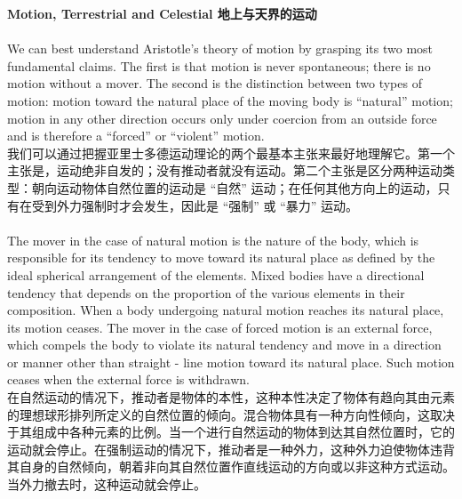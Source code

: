 \documentclass{article}
\begin{document}
\noindent\textbf{Motion, Terrestrial and Celestial 地上与天界的运动}\\
\\
We can best understand Aristotle’s theory of motion by grasping its two most fundamental claims. The first is that motion is never spontaneous; there is no motion without a mover. The second is the distinction between two types of motion: motion toward the natural place of the moving body is “natural” motion; motion in any other direction occurs only under coercion from an outside force and is therefore a “forced” or “violent” motion.\\
我们可以通过把握亚里士多德运动理论的两个最基本主张来最好地理解它。第一个主张是，运动绝非自发的；没有推动者就没有运动。第二个主张是区分两种运动类型：朝向运动物体自然位置的运动是 “自然” 运动；在任何其他方向上的运动，只有在受到外力强制时才会发生，因此是 “强制” 或 “暴力” 运动。\\

\\
The mover in the case of natural motion is the nature of the body, which is responsible for its tendency to move toward its natural place as defined by the ideal spherical arrangement of the elements. Mixed bodies have a directional tendency that depends on the proportion of the various elements in their composition. When a body undergoing natural motion reaches its natural place, its motion ceases. The mover in the case of forced motion is an external force, which compels the body to violate its natural tendency and move in a direction or manner other than straight - line motion toward its natural place. Such motion ceases when the external force is withdrawn.\\
在自然运动的情况下，推动者是物体的本性，这种本性决定了物体有趋向其由元素的理想球形排列所定义的自然位置的倾向。混合物体具有一种方向性倾向，这取决于其组成中各种元素的比例。当一个进行自然运动的物体到达其自然位置时，它的运动就会停止。在强制运动的情况下，推动者是一种外力，这种外力迫使物体违背其自身的自然倾向，朝着非向其自然位置作直线运动的方向或以非这种方式运动。当外力撤去时，这种运动就会停止。\\
\end{document}
